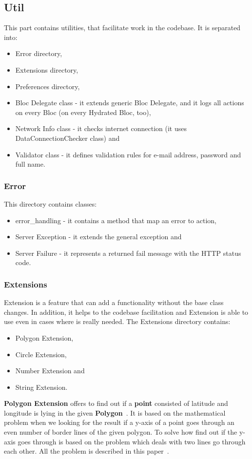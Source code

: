 \subsection{Util}\label{subsec:util}
This part contains utilities, that facilitate work in the codebase.
It is separated into:
\begin{itemize}
    \item Error directory,
    \item Extensions directory,
    \item Preferences directory,
    \item Bloc Delegate class - it extends generic Bloc Delegate, and it logs all actions on every Bloc (on every Hydrated Bloc, too),
    \item Network Info class - it checks internet connection (it uses DataConnectionChecker class) and
    \item Validator class - it defines validation rules for e-mail address, password and full name.
\end{itemize}


\subsubsection{Error}\label{subsubsec:error}
This directory contains classes:
\begin{itemize}
    \item error\_handling - it contains a method that map an error to action,
    \item Server Exception - it extends the general exception and
    \item Server Failure - it represents a returned fail message with the HTTP status code.
\end{itemize}


\subsubsection{Extensions}\label{subsubsec:extensions}
Extension is a feature that can add a functionality without the base class changes.
In addition, it helps to the codebase facilitation and Extension is able to use even in cases where is really needed.
The Extensions directory contains:
\begin{itemize}
    \item Polygon Extension,
    \item Circle Extension,
    \item Number Extension and
    \item String Extension.
\end{itemize}
\textbf{Polygon Extension} offers to find out if a \textbf{point} consisted of latitude and longitude is lying in the given \textbf{Polygon}~\cite{googleMapsPolygon}.
It is based on the mathematical problem when we looking for the result if a y-axis of a point goes through an even number of border lines of the given polygon.
To solve how find out if the y-axis goes through is based on the problem which deals with two lines go through each other.
All the problem is described in this paper~\cite{geometricAlgorithms}.

